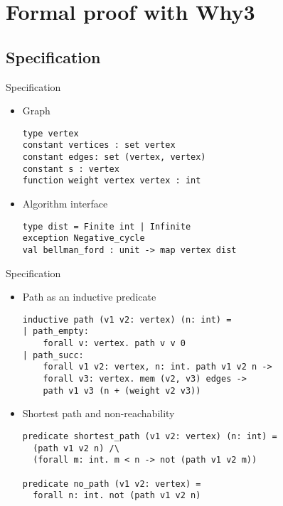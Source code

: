 \documentclass{beamer}
\begin{document}
\section{Formal proof with Why3}
\frame{\sectionpage}

\subsection{Specification}

\begin{frame}[fragile]{Specification}

\begin{itemize}
\item \alert{Graph}

\begin{lstlisting}[language=why3]
type vertex
constant vertices : set vertex
constant edges: set (vertex, vertex)
constant s : vertex
function weight vertex vertex : int
\end{lstlisting}

\item \alert{Algorithm interface}

\begin{lstlisting}[language=why3]
type dist = Finite int | Infinite
exception Negative_cycle
val bellman_ford : unit -> map vertex dist
\end{lstlisting}
\end{itemize}

\end{frame}

\begin{frame}[fragile]{Specification}

\begin{itemize}
\item \alert{Path} as an inductive predicate
\small
\begin{lstlisting}[language=why3]
inductive path (v1 v2: vertex) (n: int) =
| path_empty:
    forall v: vertex. path v v 0
| path_succ:
    forall v1 v2: vertex, n: int. path v1 v2 n ->
    forall v3: vertex. mem (v2, v3) edges ->
    path v1 v3 (n + (weight v2 v3))
\end{lstlisting}
\normalsize

\item \alert{Shortest path} and \alert{non-reachability}
\small
\begin{lstlisting}[language=why3]
predicate shortest_path (v1 v2: vertex) (n: int) =
  (path v1 v2 n) /\
  (forall m: int. m < n -> not (path v1 v2 m))

predicate no_path (v1 v2: vertex) =
  forall n: int. not (path v1 v2 n)
\end{lstlisting}
\normalsize
\end{itemize}
\end{frame}
\end{document}
